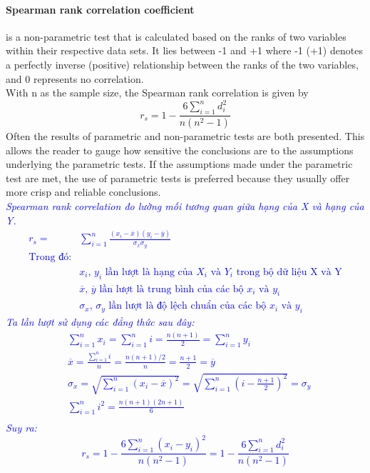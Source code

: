 \paragraph{Spearman rank correlation coefficient} %
\label{par:Spearman rank correlation coefficient}
is a non-parametric test that is calculated based on the ranks of two variables within their respective data sets. 
It lies between -1 and +1 where -1 (+1) denotes a perfectly inverse (positive) relationship between the ranks of the two variables, and 0 represents no correlation.\\
With n as the sample size, the Spearman rank correlation is given by
$$
r_s = 1 - \frac{6 \displaystyle \sum_{i=1}^{n}d^2_i}{n(n^2-1)}
$$
Often the results of parametric and non-parametric tests are both presented. 
This allows the reader to gauge how sensitive the conclusions are to the assumptions underlying the parametric tests. 
If the assumptions made under the parametric test are met, the use of parametric tests is preferred because they usually offer more crisp and reliable conclusions.\\
\textcolor{blue}{
			      \textit{
					Spearman rank correlation đo lường mối tương quan giữa hạng của X và hạng của Y.
\begin{align*}
    r_s = & \sum_{i=1}^{n}\frac{(x_i - \overline{x})(y_i - \overline{y})}{\sigma_x \sigma_y}\\
    \text{Trong đó:} & \\
    & \text{$x_i$, $y_i$ lần lượt là hạng của  $X_i$ và $Y_i$  trong bộ dữ liệu X và Y}\\
    & \text{$\overline{x}$, $\overline{y}$ lần lượt là trung bình của các bộ $x_i$ và $y_i$}\\
    & \text{$\sigma_x$, $\sigma_y$ lần lượt là độ lệch chuẩn của các bộ $x_i$ và $y_i$}
\end{align*}
Ta lần lượt sử dụng các đẳng thức sau đây:
\begin{align*}
    & \sum_{i=1}^{n} x_i = \sum_{i=1}^{n} i = \frac{n(n+1)}{2} = \sum_{i=1}^{n} y_i \\
    & \overline{x} = \frac{\displaystyle \sum_{i=1}^{n} i}{n} = \frac{n(n+1)/2}{n} = \frac{n+1}{2} = \overline{y}\\
    & \sigma_x = \sqrt{\sum_{i=1}^{n}(x_i - \overline{x})^2} = \sqrt{\sum_{i=1}^{n}(i - \frac{n+1}{2})^2} = \sigma_y\\
    & \sum_{i=1}^{n} i^2 = \frac{n(n+1)(2n+1)}{6}\\
\end{align*}
Suy ra:
$$
    r_s = 1 - \frac{6 \displaystyle\sum_{i=1}^{n}(x_i-y_i)^2}{n(n^2-1)} = 1 - \frac{6 \displaystyle\sum_{i=1}^{n}d^2_i}{n(n^2-1)}
$$
				  }
		  }
